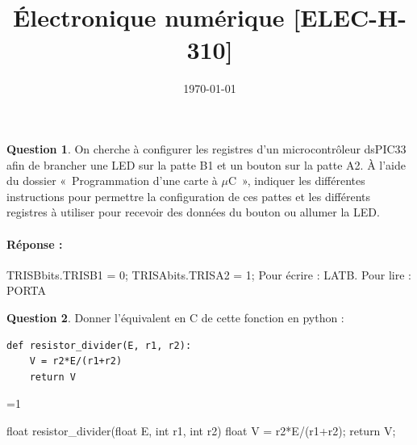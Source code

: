 \documentclass[11pt,a4paper,dvipsnames]{article}
\date{\vspace{-1.7cm}\mydate\today}
\title{\vspace{-2cm} \tpnumber \\ Électronique numérique [ELEC-H-310] \ifthenelse{\boolean{corrige}}{~\\Corrigé}{}}
\theoremstyle{definition}%
\newtheorem{Q}{Question}[] %
\newcommand{\reponse}[1]{%
	\ifthenelse {\boolean{corrige}} {\paragraph{Réponse :}
    \color{darkblue} #1 \color{black}} {}
 }
\newcounter{reponseCnt}
\begin{document}
 {\setcounter{reponseCnt}{1}} {\setcounter{reponseCnt}{0}}
\pagestyle{empty}
\maketitle
\vspace*{-1cm}

\begin{Q}
On cherche à configurer les registres d'un microcontrôleur dsPIC33 afin de brancher une LED sur la patte B1 et un bouton sur la patte A2.
À l'aide du dossier «~Programmation d'une carte à $\mu$C~», indiquer les différentes instructions pour permettre la configuration de ces pattes et les différents registres à utiliser
pour recevoir des données du bouton ou allumer la LED.

\reponse{
TRISBbits.TRISB1 = 0;
TRISAbits.TRISA2 = 1;
Pour écrire : LATB.
Pour lire : PORTA

}
\end{Q}

\begin{Q}
Donner l'équivalent en C de cette fonction en python :
\begin{verbatim}
def resistor_divider(E, r1, r2):
    V = r2*E/(r1+r2)
    return V
\end{verbatim}

\ifnum\value{reponseCnt}=1
  \begin{uC}
    float resistor_divider(float E, int r1, int r2) {
      float V = r2*E/(r1+r2);
      return V;
    }
  \end{uC}
\fi
\end{Q}
\end{document}
